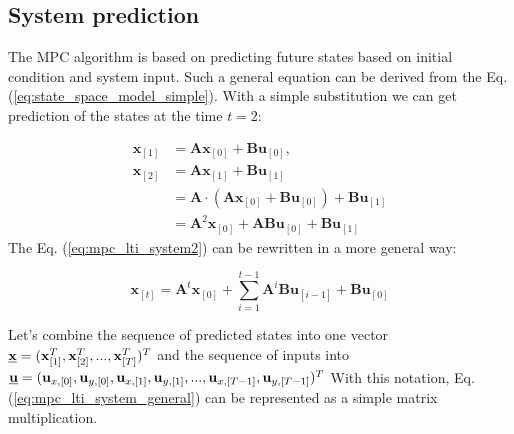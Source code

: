\documentclass[a4paper,11pt,titlepage]{article}
\newcommand{\uvec}{\textbf{\underline{u}}}
\begin{document}







\subsection{System prediction}
The MPC algorithm is based on predicting future states based on initial condition and system input. Such a general equation can be derived from the Eq. (\ref{eq:state_space_model_simple}). With a simple substitution we can get prediction of the states at the time $t = 2$:

\begin{equation}
\begin{split}
\label{eq:mpc_lti_system2}
\textbf{x}_{[1]} &= \textbf{A}\textbf{x}_{[0]} + \textbf{B}\textbf{u}_{[0]},\\
\textbf{x}_{[2]} &= \textbf{A}\textbf{x}_{[1]} + \textbf{B}\textbf{u}_{[1]}\\
&= \textbf{A}\cdot(\textbf{A}\textbf{x}_{[0]} + \textbf{B}\textbf{u}_{[0]}) + \textbf{B}\textbf{u}_{[1]} \\
&=\textbf{A}^2\textbf{x}_{[0]} + \textbf{A}\textbf{B}\textbf{u}_{[0]} + \textbf{B} \textbf{u}_{[1]}
\end{split}
\end{equation}
The Eq. (\ref{eq:mpc_lti_system2}) can be rewritten in a more general way:

\begin{equation}
\label{eq:mpc_lti_system_general}
\textbf{x}_{[t]} =\textbf{A}^t\textbf{x}_{[0]} + 
\sum_{i = 1}^{t-1}\textbf{A}^{i}\textbf{B}\textbf{u}_{[i-1]} + \textbf{B} \textbf{u}_{[0]}
\end{equation}

Let's combine the sequence of predicted states into one vector $\textbf{\underline{x}} = (\textbf{x}_{[1]}^T, \textbf{x}_{[2]}^T, ..., \textbf{x}_{[T]}^T)^T$ and the sequence of inputs into 
$\uvec = (\textbf{u}_{x,[0]}, \textbf{u}_{y,[0]}, \textbf{u}_{x,[1]}, \textbf{u}_{y,[1]}, ..., \textbf{u}_{x,[T-1]}, \textbf{u}_{y,[T-1]})^T$
With this notation, Eq. (\ref{eq:mpc_lti_system_general}) can be represented as a simple matrix multiplication.
\end{document}

